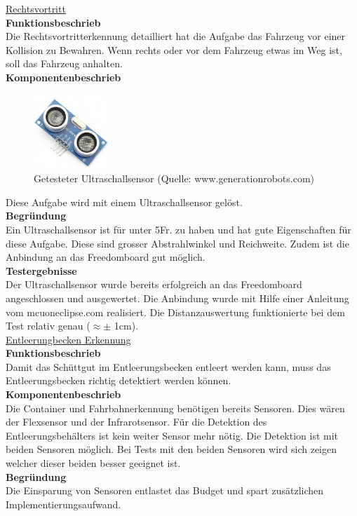 \underline{Rechtsvortritt} \\[0.2cm]
\textbf{Funktionsbeschrieb}\\[0.2cm]
Die Rechtsvortritterkennung detailliert hat die Aufgabe das Fahrzeug vor einer Kollision zu Bewahren. Wenn rechts oder vor dem Fahrzeug etwas im Weg ist, soll das Fahrzeug anhalten.\\[0.2cm]
\textbf{Komponentenbeschrieb}\\[0.2cm]
\begin{figure} [H]
	\centering
	\includegraphics[width=0.25\textwidth]{03_Loesungskonzept/pictures/ultraschallsensor.png}
	\caption{Getesteter Ultraschallsensor (Quelle: www.generationrobots.com)}
\end{figure}
Diese Aufgabe wird mit einem Ultraschallsensor gelöst. \\[0.2cm]
\textbf{Begründung}\\[0.2cm]
Ein Ultraschallsensor ist für unter 5Fr. zu haben und hat gute Eigenschaften für diese Aufgabe. Diese sind grosser Abstrahlwinkel und Reichweite.
Zudem ist die Anbindung an das Freedomboard gut möglich.\\[0.2cm]
\textbf{Testergebnisse}\\[0.2cm]
Der Ultraschallsensor wurde bereits erfolgreich an das Freedomboard angeschlossen und  ausgewertet. Die Anbindung wurde mit Hilfe einer Anleitung vom mcuoneclipse.com realisiert. Die Distanzauswertung funktionierte bei dem Test relativ genau ($\approx \pm $ 1cm).\\[0.2cm]

\underline{Entleerungbecken Erkennung} \\[0.2cm]
\textbf{Funktionsbeschrieb}\\[0.2cm]
Damit das Schüttgut im Entleerungsbecken entleert werden kann, muss das Entleerungsbecken richtig detektiert werden können. \\[0.2cm]
\textbf{Komponentenbeschrieb}\\[0.2cm]
Die Container und Fahrbahnerkennung benötigen bereits Sensoren. Dies wären der Flexsensor und der Infrarotsensor. Für die Detektion des Entleerungsbehälters ist kein weiter Sensor mehr nötig. Die Detektion ist mit beiden Sensoren möglich. Bei Tests mit den beiden Sensoren wird sich zeigen welcher dieser beiden besser geeignet ist.\\[0.2cm]
\textbf{Begründung}\\[0.2cm]
Die Einsparung von Sensoren entlastet das Budget und spart zusätzlichen Implementierungsaufwand.\\[0.2cm]